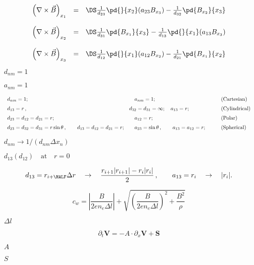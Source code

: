 \documentclass{article}
\begin{document}
\[
   \begin{array}{lcl}
    \left(\nabla\times\vec{B}\right)_{x_1} &=&  \DS
      \frac{1}{d_{23}}\pd{}{x_2}(a_{23}B_{x_3})
    - \frac{1}{d_{32}}\pd{B_{x_2}}{x_3}
 \\ \noalign{\bigskip}
    \left(\nabla\times\vec{B}\right)_{x_2} &=&  \DS
      \frac{1}{d_{31}}\pd{B_{x_1}}{x_3}
    - \frac{1}{d_{13}}\pd{}{x_1}(a_{13}B_{x_3})
 \\ \noalign{\bigskip}
    \left(\nabla\times\vec{B}\right)_{x_3} &=&  \DS
      \frac{1}{d_{12}}\pd{}{x_1}(a_{12}B_{x_2})
    - \frac{1}{d_{21}}\pd{B_{x_1}}{x_2}
   \end{array}
\]
\pagebreak

$d_{nm}=1$
\pagebreak

$a_{nm}=1$
\pagebreak

\[
   \begin{array}{lll}
          d_{nm} = 1; & 
   \quad  a_{nm} = 1; & 
   \qquad ({\rm Cartesian})
   \\ \noalign{\medskip}
         d_{13} = r\,,\qquad & 
         d_{32} = d_{31} = \infty;  
   \quad a_{13} = r;  & 
   \qquad ({\rm Cylindrical})
   \\ \noalign{\medskip}
         d_{23} = d_{12} = d_{21} = r; & 
   \quad a_{12} = r;  & 
   \qquad ({\rm Polar})
   \\ \noalign{\medskip}
     d_{23} = d_{32} = d_{31} = r\sin\theta \,,\qquad
     d_{13} = d_{12} = d_{21} = r; &  
   \quad  a_{23} = \sin\theta\,,\qquad a_{13} = a_{12} = r; &
   \qquad ({\rm Spherical})
   \end{array}
\]
\pagebreak

$d_{nm} \to 1/(d_{nm}\Delta x_n)$
\pagebreak

$ d_{13} (d_{12})
      \quad\mathrm{at}\quad r=0$
\pagebreak

\[
         d_{13} = r_{i+\HALF}\Delta r \quad\to\quad
                  \frac{r_{i+1}|r_{i+1}| - r_i |r_i|}{2}\,,\qquad

         a_{13} = r_i \quad\to\quad  |r_i|.                
      \]
\pagebreak

\[
  c_w =   \left|\frac{B}{2en_e\Delta l}\right|
        + \sqrt{\left(\frac{B}{2en_e\Delta l}\right)^2 + \frac{B^2}{\rho}}
\]
\pagebreak

$\Delta l$
\pagebreak

\[ 
    \partial_t{\mathbf{V}} = - A\cdot\partial_x\mathbf{V} + \mathbf{S}
\]
\pagebreak

$ A $
\pagebreak

$ S $
\pagebreak
\end{document}
